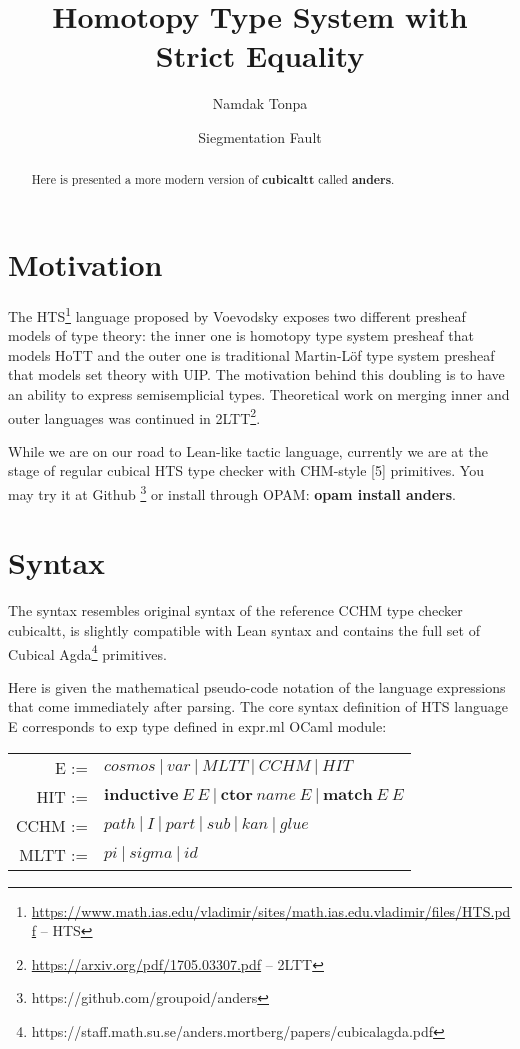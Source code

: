 \documentclass[a4paper,UKenglish,cleveref, autoref, thm-restate]{lipics-v2021}
\title{Homotopy Type System with Strict Equality}
\author{Namdak Tonpa}{Groupoid Infinity}{maxim@synrc.com}{https://orcid.org/0000-0001-7127-8796}{}
\author{Siegmentation Fault}{Groupoid Infinity}{siegmentationfault@yandex.ru}{}{}
\begin{document}
\maketitle

\begin{abstract}
Here is presented a more modern version of \textbf{cubicaltt} called \textbf{anders}.
\end{abstract}

\section{Motivation}
\label{sec:typesetting-summary}

The HTS\footnote{\url{https://www.math.ias.edu/vladimir/sites/math.ias.edu.vladimir/files/HTS.pdf} -- HTS}
language proposed by Voevodsky exposes two different presheaf models of type theory:
the inner one is homotopy type system presheaf that models HoTT and the outer one is traditional Martin-Löf
type system presheaf that models set theory with UIP. The motivation behind this doubling is to
have an ability to express semisemplicial types. Theoretical work on merging inner
and outer languages was continued in 2LTT\footnote{\url{https://arxiv.org/pdf/1705.03307.pdf} -- 2LTT}.

While we are on our road to Lean-like tactic language, currently we are at the stage of regular
cubical HTS type checker with CHM-style [5] primitives. You may try it at Github \footnote{https://github.com/groupoid/anders} or install through OPAM: \textbf{opam install anders}.

\section{Syntax}

The syntax resembles original syntax of the reference CCHM type checker cubicaltt,
is slightly compatible with Lean syntax and contains the full set of Cubical Agda\footnote{https://staff.math.su.se/anders.mortberg/papers/cubicalagda.pdf} primitives.

Here is given the mathematical pseudo-code notation of the language expressions that come immediately after parsing. The core syntax definition of HTS language E
corresponds to exp type defined in expr.ml OCaml module:

\begin{table}[ht]
\begin{tabular}{rl}
      E :=&$cosmos\ |\ var\ |\ MLTT\ |\ CCHM\ |\ HIT$ \\
    HIT :=&$\mathbf{inductive}\ E\ E\ |\ \mathbf{ctor}\ name\ E\ |\ \mathbf{match}\ E\ E$ \\
   CCHM :=&$path\ |\ I\ |\ part\ |\ sub\ |\ kan\ |\ glue$ \\
   MLTT :=&$pi\ |\ sigma\ |\ id$ \\
\end{tabular}
\end{table}
\end{document}
